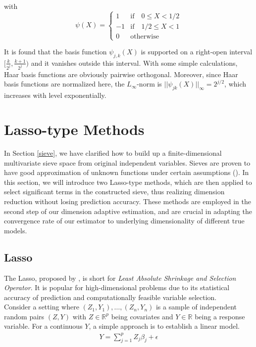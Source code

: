 \documentclass[12pt, a4paper]{article}
\theoremstyle{MAstyle} \newtheorem{assumption}{Assumption}[section]
\theoremstyle{MAstyle} \newtheorem{definition}{Definition}[section]
\theoremstyle{MAstyle} \newtheorem{theorem}{Theorem}[section]
\theoremstyle{MAstyle} \newtheorem{corollary}{Corollary}[section]
\begin{document}
        with
        \[
            \psi(X)=
            \begin{cases}
                1 & \mathrm{if} \quad 0 \le X < 1/2 \\
                -1 & \mathrm{if} \quad 1/2 \le X < 1 \\
                0 & \mathrm{otherwise}
            \end{cases}
        \]

        It is found that the basis function $\psi_{j,k}(X)$ is supported on a right-open interval $[\frac{k}{2^j}, \frac{k+1}{2^j})$ and it vanishes outside this interval. With some simple calculations, Haar basis functions are obviously pairwise orthogonal. Moreover, since Haar basis functions are normalized here, the $L_{\infty}$-norm is $||\psi_{jk}(X)||_{\infty}=2^{j/2}$, which increases with level exponentially. 
        
        \newpage
        \section{Lasso-type Methods}\label{lasso-type_method}

        In Section \ref{sieve}, we have clarified how to build up a finite-dimensional multivariate sieve space from original independent variables. Sieves are proven to have good approximation of unknown functions under certain assumptions (\cite{Chen_2007}). In this section, we will introduce two Lasso-type methods, which are then applied to select significant terms in the constructed sieve, thus realizing dimension reduction without losing prediction accuracy. These methods are employed in the second step of our dimension adaptive estimation, and are crucial in adapting the convergence rate of our estimator to underlying dimensionality of different true models.

        \subsection{Lasso}\label{lasso}

        The Lasso, proposed by \cite{Tibshirani_1996}, is short for \textit{Least Absolute Shrinkage and Selection Operator}. It is popular for high-dimensional problems due to its statistical accuracy of prediction and computationally feasible variable selection. \\

        Consider a setting where $(Z_1, Y_1), \ldots, (Z_n,Y_n)$ is a sample of independent random pairs $(Z,Y)$ with $Z \in \mathbb{R}^p$ being covariates and $Y \in \mathbb{R}$ being a response variable. For a continuous $Y$, a simple approach is to establish a linear model.
        \begin{align}\label{linear_model}
            Y=\sum\limits_{j=1}^p Z_j\beta_j+\epsilon
        \end{align}
\end{document}
